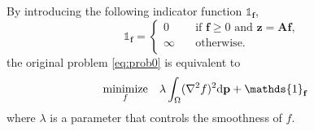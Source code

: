 By introducing the following indicator function $\mathds{1}_{\mathbf{f}}$,
\begin{equation}
\mathds{1}_{\mathbf{f}} = \left\{
	\begin{array}{ll}
		0 & \quad\text{if $\mathbf{f} \geq 0$ and $\mathbf{z} = \mathbf{Af}$,}\\
		\infty & \quad\text{otherwise.}\\
	\end{array}
\right.
\end{equation}
the original problem \eqref{eq:prob0} is equivalent to
\begin{equation}
\label{eq:add-auxiliary}
\begin{split}
	\underset{f}{\mbox{minimize}} \quad 		
	& \lambda \int_\Omega(\nabla^2 f)^2\ud\mathbf p + \mathds{1}_{\mathbf{f}}
\end{split}
\end{equation}
where $\lambda$ is a parameter that controls the smoothness of $f$.

